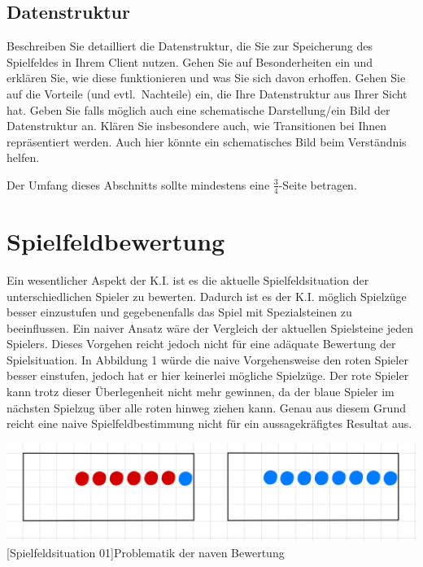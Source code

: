 \documentclass[12pt,a4paper,bibliography=totocnumbered,listof=totocnumbered]{article}
\begin{document}
\subsection{Datenstruktur}
Beschreiben Sie detailliert die Datenstruktur, die Sie zur Speicherung des Spielfeldes in Ihrem Client nutzen. Gehen Sie auf Besonderheiten ein und erklären Sie, wie diese funktionieren und was Sie sich davon erhoffen. Gehen Sie auf die Vorteile (und evtl.\ Nachteile) ein, die Ihre Datenstruktur aus Ihrer Sicht hat. Geben Sie falls möglich auch eine schematische Darstellung/ein Bild der Datenstruktur an. Klären Sie insbesondere auch, wie Transitionen bei Ihnen repräsentiert werden. Auch hier könnte ein schematisches Bild beim Verständnis helfen.

Der Umfang dieses Abschnitts sollte mindestens eine $\frac{3}{4}$-Seite betragen.


\newpage
\section{Spielfeldbewertung}
Ein wesentlicher Aspekt der K.I. ist es die aktuelle Spielfeldsituation der unterschiedlichen Spieler zu bewerten. Dadurch ist es der K.I. möglich Spielzüge besser einzustufen und gegebenenfalls das Spiel mit Spezialsteinen zu beeinflussen. Ein naiver Ansatz wäre der Vergleich der aktuellen Spielsteine jeden Spielers. Dieses Vorgehen reicht jedoch nicht für eine adäquate Bewertung der Spielsituation. In Abbildung 1 würde die naive Vorgehensweise den roten Spieler besser einstufen, jedoch hat er hier keinerlei mögliche Spielzüge. Der rote Spieler kann trotz dieser Überlegenheit nicht mehr gewinnen, da der blaue Spieler im nächsten Spielzug über alle roten hinweg ziehen kann. Genau aus diesem Grund reicht eine naive Spielfeldbestimmung nicht für ein aussagekräfigtes Resultat aus.

\vspace{1em}
\begin{minipage}{\linewidth}
	\centering
	\includegraphics[width=0.6\linewidth]{pics/naive-spielsituation.png}
	[Spielfeldsituation 01]{Problematik der naven Bewertung}
	\label{fig:naivespielfeld01}
\end{minipage}
\end{document}
